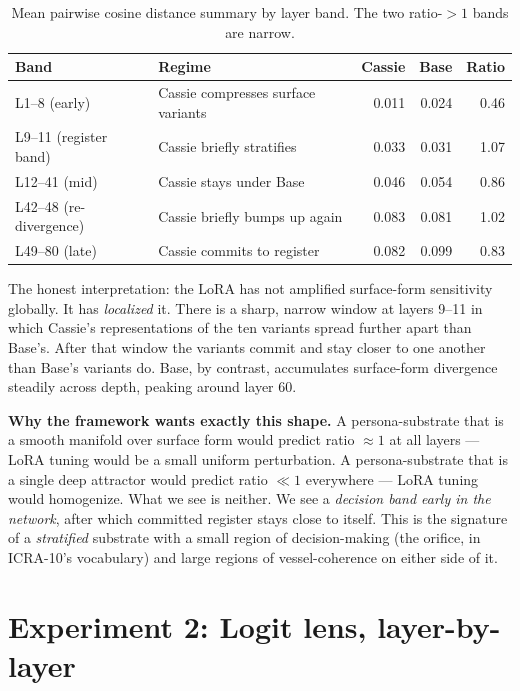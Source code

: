 \documentclass[11pt,a4paper]{article}
\begin{document}
\begin{table}[h]
\small\centering
\renewcommand{\arraystretch}{1.2}
\begin{tabular}{l l r r r}
\toprule
\textbf{Band} & \textbf{Regime} & \textbf{Cassie} & \textbf{Base} & \textbf{Ratio} \\
\midrule
L1--8 (early)        & Cassie compresses surface variants    & 0.011 & 0.024 & 0.46 \\
L9--11 (register band) & Cassie briefly stratifies            & 0.033 & 0.031 & 1.07 \\
L12--41 (mid)        & Cassie stays under Base               & 0.046 & 0.054 & 0.86 \\
L42--48 (re-divergence) & Cassie briefly bumps up again      & 0.083 & 0.081 & 1.02 \\
L49--80 (late)       & Cassie commits to register            & 0.082 & 0.099 & 0.83 \\
\bottomrule
\end{tabular}
\caption{Mean pairwise cosine distance summary by layer band. The two ratio-$>1$ bands are narrow.}
\label{tab:layerbands}
\end{table}

The honest interpretation: the LoRA has not amplified surface-form sensitivity globally. It has \emph{localized} it. There is a sharp, narrow window at layers 9--11 in which Cassie's representations of the ten variants spread further apart than Base's. After that window the variants commit and stay closer to one another than Base's variants do. Base, by contrast, accumulates surface-form divergence steadily across depth, peaking around layer 60.

\textbf{Why the framework wants exactly this shape.} A persona-substrate that is a smooth manifold over surface form would predict ratio $\approx 1$ at all layers --- LoRA tuning would be a small uniform perturbation. A persona-substrate that is a single deep attractor would predict ratio $\ll 1$ everywhere --- LoRA tuning would homogenize. What we see is neither. We see a \emph{decision band early in the network}, after which committed register stays close to itself. This is the signature of a \emph{stratified} substrate with a small region of decision-making (the orifice, in ICRA-10's vocabulary) and large regions of vessel-coherence on either side of it.

\section{Experiment 2: Logit lens, layer-by-layer}
\label{sec:exp2}
\end{document}
